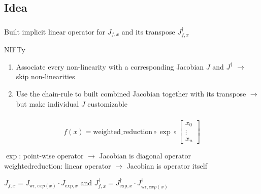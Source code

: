 \documentclass[aspectratio=169,xcolor=dvipsnames]{beamer}
\begin{document}
\subsection{Idea}
\begin{frame}
	\frametitle{\insertsection}
	\framesubtitle{\insertsubsection}

	Built implicit linear operator for $J_{f,x}$ and its transpose $J_{f,x}^\dagger$

	\pause
	\vspace{3em}
	NIFTy
	\begin{enumerate}
		\item Associate every non-linearity with a corresponding Jacobian $J$ and $J^\dagger$ $\rightarrow$ skip non-linearities
		\pause
		\item Use the chain-rule to built combined Jacobian together with its transpose $\rightarrow$ but make individual $J$ customizable
	\end{enumerate}

\end{frame}

\begin{frame}
	\frametitle{\insertsection}
	\framesubtitle{\insertsubsection}

	\begin{equation*}
		f(x) =
		\text{weighted\_reduction}
		\circ
		\exp
		\circ
		\begin{bmatrix}
			x_{0} \\
			\vdots \\
			x_{n}
		\end{bmatrix}
	\end{equation*}

	\vspace{1em}
	$\exp$: point-wise operator $\rightarrow$ Jacobian is diagonal operator
	\\ weighted\textunderscore{}reduction: linear operator $\rightarrow$ Jacobian is operator itself

	\vspace{2em}
	\begin{center}
		$J_{f,x} = J_{\text{wr},exp(x)} \cdot J_{\text{exp},x}$
		\hspace{2em}
		and
		\hspace{2em}
		$J_{f,x}^\dagger = J_{\text{exp},x}^\dagger \cdot J_{\text{wr},exp(x)}^\dagger$
	\end{center}

\end{frame}
\end{document}
